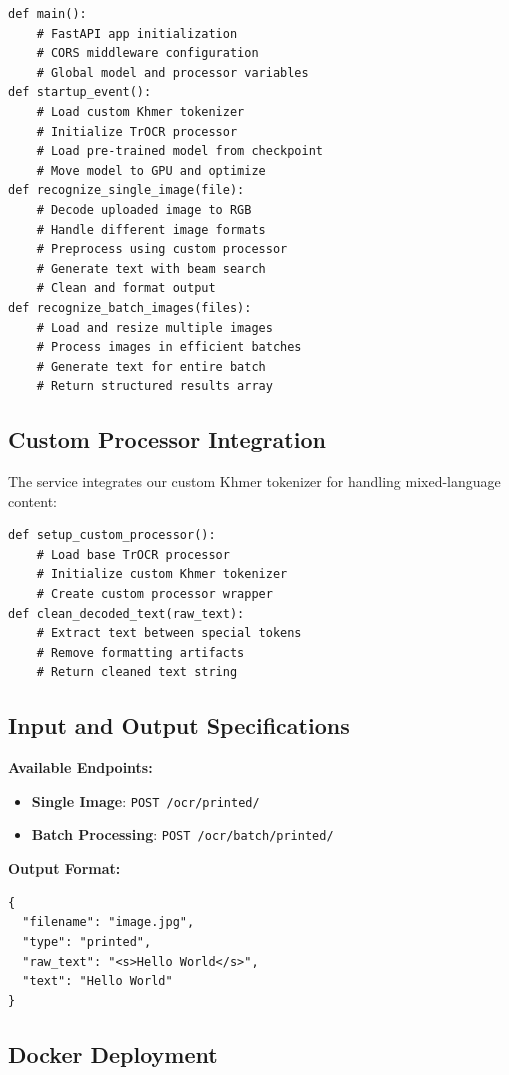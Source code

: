 {\begin{verbatim}
def main():
    # FastAPI app initialization
    # CORS middleware configuration
    # Global model and processor variables
def startup_event():
    # Load custom Khmer tokenizer
    # Initialize TrOCR processor
    # Load pre-trained model from checkpoint
    # Move model to GPU and optimize
def recognize_single_image(file):
    # Decode uploaded image to RGB
    # Handle different image formats
    # Preprocess using custom processor
    # Generate text with beam search
    # Clean and format output
def recognize_batch_images(files):
    # Load and resize multiple images
    # Process images in efficient batches
    # Generate text for entire batch
    # Return structured results array

\end{verbatim}

\subsection{Custom Processor Integration}
\label{subsec:custom-processor}

The service integrates our custom Khmer tokenizer for handling mixed-language content:

\begin{verbatim}
def setup_custom_processor():
    # Load base TrOCR processor
    # Initialize custom Khmer tokenizer
    # Create custom processor wrapper
def clean_decoded_text(raw_text):
    # Extract text between special tokens
    # Remove formatting artifacts
    # Return cleaned text string 
\end{verbatim}
\subsection{Input and Output Specifications}
\label{subsec:trocr-io}
\textbf{Available Endpoints:}
\begin{itemize}
\item \textbf{Single Image}: \texttt{POST /ocr/printed/}
\item \textbf{Batch Processing}: \texttt{POST /ocr/batch/printed/}
\end{itemize}

\textbf{Output Format:}
\begin{verbatim}
{
  "filename": "image.jpg",
  "type": "printed",
  "raw_text": "<s>Hello World</s>",
  "text": "Hello World"
}
\end{verbatim}

\subsection{Docker Deployment}
\label{subsec:trocr-docker}

}
